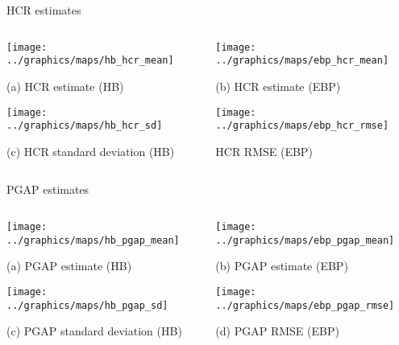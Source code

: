 \begin{frame}{HCR estimates}

    \begin{columns}
        \begin{column}{0.49\textwidth}
            \centering

            \texttt{[image: ../graphics/maps/hb\_hcr\_mean]}

            \scriptsize{(a) HCR estimate (HB)}

            \texttt{[image: ../graphics/maps/hb\_hcr\_sd]}

            \scriptsize{(c) HCR standard deviation (HB)}

        \end{column}



        \begin{column}{0.49\textwidth}
            \texttt{[image: ../graphics/maps/ebp\_hcr\_mean]}

            \scriptsize{(b) HCR estimate (EBP)}

            \texttt{[image: ../graphics/maps/ebp\_hcr\_rmse]}

            \scriptsize{HCR RMSE (EBP)}
        \end{column}
    \end{columns}
\end{frame}

\begin{frame}{PGAP estimates}

    \begin{columns}
        \begin{column}{0.49\textwidth}
            \centering

            \texttt{[image: ../graphics/maps/hb\_pgap\_mean]}

            \scriptsize{(a) PGAP estimate (HB)}

            \texttt{[image: ../graphics/maps/hb\_pgap\_sd]}

            \scriptsize{(c) PGAP standard deviation (HB)}

        \end{column}



        \begin{column}{0.49\textwidth}
            \texttt{[image: ../graphics/maps/ebp\_pgap\_mean]}

            \scriptsize{(b) PGAP estimate (EBP)}

            \texttt{[image: ../graphics/maps/ebp\_pgap\_rmse]}

            \scriptsize{(d) PGAP RMSE (EBP)}
        \end{column}
    \end{columns}
\end{frame}

